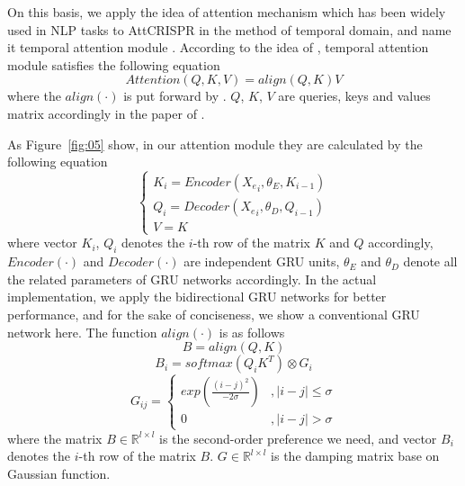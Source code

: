 \documentclass{bioinfo}
\begin{document}
On this basis, we apply the idea of attention mechanism which has been widely used in NLP tasks to AttCRISPR in the method of temporal domain, 
and name it temporal attention module \citep{luong2015effective,vaswani2017attention}.
According to the idea of \citeauthor{vaswani2017attention}, temporal attention module satisfies the following equation
\begin{equation}
Attention(Q,K,V)=align(Q,K)V\label{eq:13}
\end{equation}
where the $align(\cdot)$ is put forward by \citeauthor{luong2015effective}. 
$Q$, $K$, $V$ are queries, keys and values matrix accordingly in the paper of \citeauthor{vaswani2017attention}. 

As Figure~\ref{fig:05} show, in our attention module they are calculated by the following equation
\begin{equation}
\left\{\begin{array}{l}
K_i=Encoder({X_e}_i,\theta_E,K_{i-1})
\\ Q_i=Decoder({X_e}_i,\theta_D,Q_{i-1})
\\V=K 
\end{array}\right.\label{eq:14}
\end{equation}
where vector $K_i$, $Q_i$ denotes the $i$-th row of the matrix $K$ and $Q$ accordingly, $Encoder(\cdot)$ and $Decoder(\cdot)$ are independent GRU units, $\theta_E$ and $\theta_D$ denote all the related parameters of GRU networks accordingly. 
In the actual implementation, we apply the bidirectional GRU networks for better performance, and for the sake of conciseness, we show a conventional GRU network here. 
The function $align(\cdot)$ is as follows
\begin{equation}
B=align(Q,K)\label{eq:16}
\end{equation}
\begin{equation}
B_i=softmax(Q_iK^T)\otimes G_i\label{eq:17}
\end{equation}
\begin{equation}
G_{ij}=\left\{\begin{matrix}
exp(\frac{(i-j)^2}{-2\sigma})&,\left | i-j \right |\leqslant \sigma
\\ 0&,\left | i-j \right |>  \sigma
\end{matrix}\right.\label{eq:18}
\end{equation}
where the matrix $B\in\mathbb{R}^{l\times l}$ is the second-order preference we need, and vector $B_i$ denotes the $i$-th row of the matrix $B$. 
$G\in\mathbb{R}^{l\times l}$ is the damping matrix base on Gaussian function. 
\end{document}
